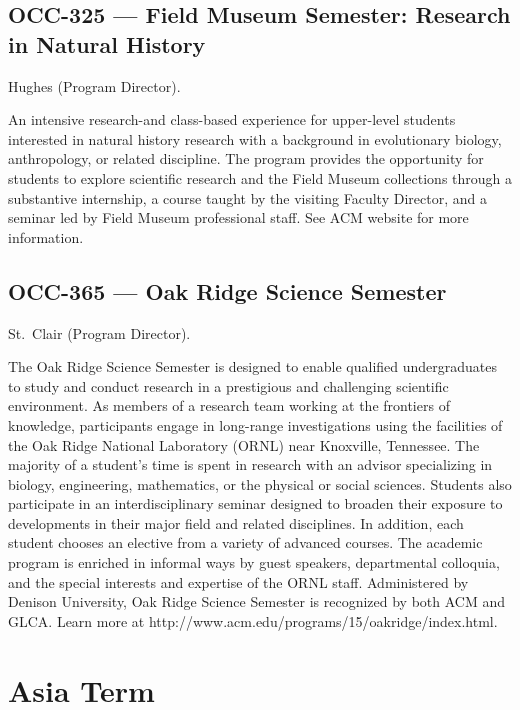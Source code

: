 \documentclass[
  letterpaper,
]{scrbook}
\begin{document}
\hypertarget{occ-325-field-museum-semester-research-in-natural-history}{%
\subsection{OCC-325 --- Field Museum Semester: Research in Natural
History}\label{occ-325-field-museum-semester-research-in-natural-history}}

Hughes (Program Director).

An intensive research-and class-based experience for upper-level
students interested in natural history research with a background in
evolutionary biology, anthropology, or related discipline. The program
provides the opportunity for students to explore scientific research and
the Field Museum collections through a substantive internship, a course
taught by the visiting Faculty Director, and a seminar led by Field
Museum professional staff. See ACM website for more information.

\hypertarget{occ-365-oak-ridge-science-semester}{%
\subsection{OCC-365 --- Oak Ridge Science
Semester}\label{occ-365-oak-ridge-science-semester}}

St.~Clair (Program Director).

The Oak Ridge Science Semester is designed to enable qualified
undergraduates to study and conduct research in a prestigious and
challenging scientific environment. As members of a research team
working at the frontiers of knowledge, participants engage in long-range
investigations using the facilities of the Oak Ridge National Laboratory
(ORNL) near Knoxville, Tennessee. The majority of a student's time is
spent in research with an advisor specializing in biology, engineering,
mathematics, or the physical or social sciences. Students also
participate in an interdisciplinary seminar designed to broaden their
exposure to developments in their major field and related disciplines.
In addition, each student chooses an elective from a variety of advanced
courses. The academic program is enriched in informal ways by guest
speakers, departmental colloquia, and the special interests and
expertise of the ORNL staff. Administered by Denison University, Oak
Ridge Science Semester is recognized by both ACM and GLCA. Learn more at
http://www.acm.edu/programs/15/oakridge/index.html.

\hypertarget{asia-term}{%
\section{Asia Term}\label{asia-term}}
\end{document}
